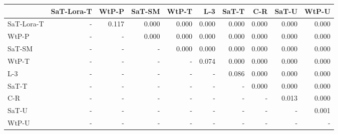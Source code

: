 \begin{tabular}{lrrrrrrrrr}
\toprule
 & SaT-Lora-T & WtP-P & SaT-SM & WtP-T & L-3 & SaT-T & C-R & SaT-U & WtP-U \\
\midrule
SaT-Lora-T & - & 0.117 & 0.000 & 0.000 & 0.000 & 0.000 & 0.000 & 0.000 & 0.000 \\
WtP-P & - & - & 0.000 & 0.000 & 0.000 & 0.000 & 0.000 & 0.000 & 0.000 \\
SaT-SM & - & - & - & 0.000 & 0.000 & 0.000 & 0.000 & 0.000 & 0.000 \\
WtP-T & - & - & - & - & 0.074 & 0.000 & 0.000 & 0.000 & 0.000 \\
L-3 & - & - & - & - & - & 0.086 & 0.000 & 0.000 & 0.000 \\
SaT-T & - & - & - & - & - & - & 0.000 & 0.000 & 0.000 \\
C-R & - & - & - & - & - & - & - & 0.013 & 0.000 \\
SaT-U & - & - & - & - & - & - & - & - & 0.001 \\
WtP-U & - & - & - & - & - & - & - & - & - \\
\bottomrule
\end{tabular}

